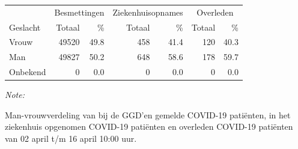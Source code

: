 \documentclass[
  english,
  man,floatsintext]{apa6}
\begin{document}
\begin{table}
\centering\begingroup\fontsize{11}{13}\selectfont

\begin{threeparttable}
\begin{tabular}{lrrrrrr}
\toprule
\multicolumn{1}{c}{ } & \multicolumn{2}{c}{Besmettingen} & \multicolumn{2}{c}{Ziekenhuisopnames} & \multicolumn{2}{c}{Overleden} \\
\cmidrule(l{3pt}r{3pt}){2-3} \cmidrule(l{3pt}r{3pt}){4-5} \cmidrule(l{3pt}r{3pt}){6-7}
Geslacht & Totaal & \% & Totaal & \% & Totaal & \%\\
\midrule
Vrouw & 49520 & 49.8 & 458 & 41.4 & 120 & 40.3\\
Man & 49827 & 50.2 & 648 & 58.6 & 178 & 59.7\\
Onbekend & 0 & 0.0 & 0 & 0.0 & 0 & 0.0\\
\bottomrule
\end{tabular}
\begin{tablenotes}
\item \textit{Note: } 
\item Man-vrouwverdeling van bij de GGD’en gemelde COVID-19 patiënten, in het ziekenhuis opgenomen COVID-19 patiënten en overleden COVID-19 patiënten van 02 april t/m 16 april 10:00 uur.
\end{tablenotes}
\end{threeparttable}
\endgroup{}
\end{table}
\newpage
\end{document}
